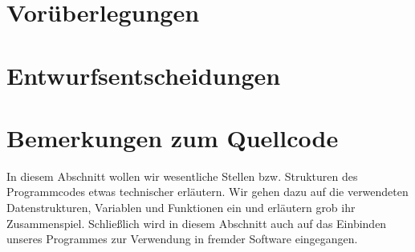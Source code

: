 \documentclass[12pt,a4paper]{article}
\begin{document}
\section{Vorüberlegungen}
	
\clearpage
\section{Entwurfsentscheidungen}
	
	
	
	
%
%
\clearpage
\section{Bemerkungen zum Quellcode}
In diesem Abschnitt wollen wir wesentliche Stellen bzw. Strukturen des Programmcodes etwas technischer erläutern. Wir gehen dazu auf die verwendeten Datenstrukturen, Variablen und Funktionen ein und erläutern grob ihr Zusammenspiel. Schließlich wird in diesem Abschnitt auch auf das Einbinden unseres Programmes zur Verwendung in fremder Software eingegangen.
	
	
	
%
%
\clearpage


\newpage
\nocite{*}
\printbibliography
\end{document}
